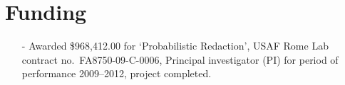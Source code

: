 \documentclass[letterpaper]{article}
\begin{document}
\section*{Funding}

\begin{itemize}
	\item[-] Awarded \$968,412.00 for `Probabilistic Redaction', USAF Rome Lab contract
	no.\ FA8750-09-C-0006, Principal investigator (PI) for period of performance
	2009--2012, project completed.
\end{itemize}

%
%
%
%
%
%
%
%
%
%
%
\end{document}
